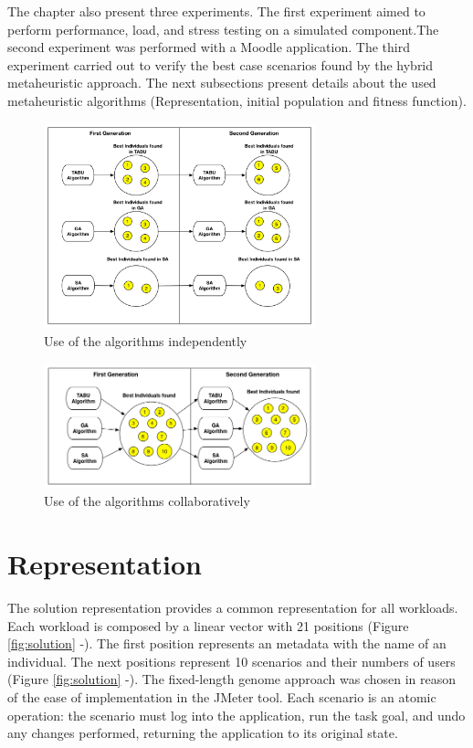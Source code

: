 \documentclass[espaco=umemeio,chapter=TITLE,twoside,openright]{abnt}
\begin{document}
The chapter also present three experiments. The first experiment aimed to perform performance, load, and stress testing on a simulated component.The second experiment was performed with a Moodle application. The third experiment carried out to verify the best case scenarios found by the hybrid metaheuristic approach.  The next subsections present details about the used metaheuristic algorithms (Representation, initial population and fitness function).

\begin{figure}[h]
\centering
\includegraphics[width=0.7\textwidth]{./images/independ.png}
\caption{Use of the algorithms independently \cite{Gois2016}}
\label{fig:firstaproach}
\end{figure}

\begin{figure}[h]
\centering
\includegraphics[width=0.7\textwidth]{./images/collaborative.png}
\caption{Use of the  algorithms collaboratively \cite{Gois2016}}
\label{fig:secondapproach}
\end{figure}



\section{Representation}

The solution representation provides a common representation for all workloads. Each workload is composed by a linear vector with 21 positions (Figure \ref{fig:solution}  -). The first position represents an metadata with the name of an individual. The next positions represent 10 scenarios and their numbers of users (Figure \ref{fig:solution}  -). The fixed-length genome approach was chosen in reason of the ease of implementation in the JMeter tool. Each scenario is an atomic operation: the scenario must log into the application, run the task goal, and undo any changes performed, returning the application to its original state.
\end{document}

